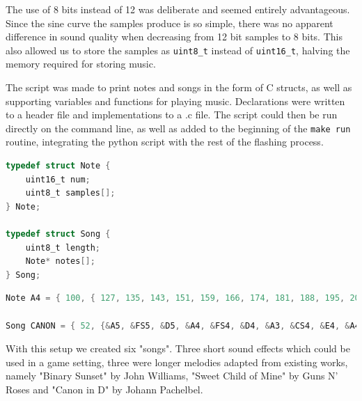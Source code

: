 The use of 8 bits instead of 12 was deliberate and seemed entirely advantageous. Since the sine curve the samples produce is so simple, there was no apparent difference in sound quality when decreasing from 12 bit samples to 8 bits. This also allowed us to store the samples as \texttt{uint8\_t} instead of \texttt{uint16\_t}, halving the memory required for storing music.

The script was made to print notes and songs in the form of C structs, as well as supporting variables and functions for playing music. Declarations were written to a header file and implementations to a .c file. The script could then be run directly on the command line, as well as added to the beginning of the \texttt{make run} routine, integrating the python script with the rest of the flashing process.

\begin{minipage}{\linewidth}
\begin{lstlisting}[language=C, label=structs, caption=Excerpt from music.h]
typedef struct Note {
	uint16_t num;
	uint8_t samples[];
} Note;

typedef struct Song {
	uint8_t length;
	Note* notes[];
} Song;
\end{lstlisting}
\end{minipage}

\begin{minipage}{\linewidth}
\begin{lstlisting}[language=C, label=note-song, caption=Excerpts from music.c]
Note A4 = { 100, { 127, 135, 143, 151, 159, 166, 174, 181, 188, 195, 202, 208, 214, 220, 225, 230, 234, 239, 242, 245, 248, 250, 252, 253, 254, 254, 254, 254, 252, 251, 248, 246, 243, 239, 235, 231, 226, 220, 215, 209, 203, 196, 189, 182, 175, 167, 160, 152, 144, 136, 128, 120, 112, 104, 96, 89, 81, 74, 67, 60, 53, 47, 41, 35, 30, 25, 20, 16, 12, 9, 6, 4, 2, 1, 0, 0, 0, 0, 2, 3, 5, 8, 11, 15, 19, 23, 28, 33, 39, 44, 51, 57, 64, 71, 78, 86, 94, 101, 109, 117 } };

Song CANON = { 52, {&A5, &FS5, &D5, &A4, &FS4, &D4, &A3, &CS4, &E4, &A4, &CS5, &E5, &FS5, &D5, &B4, &FS4, &D4, &B3, &FS3, &A3, &CS4, &FS4, &A4, &CS5, &D5, &B4, &G4, &D4, &B3, &G3, &D3, &FS3, &A3, &D4, &FS4, &A4, &B4, &G4, &D4, &B3, &G3, &D3, &A3, &CS4, &E4, &A4, &CS5, &E5, &A5, &A5, &A5, &A5} };
\end{lstlisting}
\end{minipage}

With this setup we created six "songs". Three short sound effects which could be used in a game setting, three were longer melodies adapted from existing works, namely "Binary Sunset" by John Williams, "Sweet Child of Mine" by Guns N' Roses and "Canon in D" by Johann Pachelbel.

